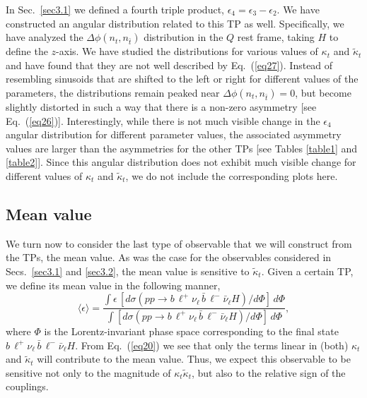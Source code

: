 \documentclass[aps,preprint,tightenlines,floatfix,superscriptaddress,nofootinbib,showpacs]{revtex4-1}
\def\beq{\begin{equation}}
\def\eeq{\end{equation}}
\def\tbar{\bar{t}}
\def\bbar{\bar{b}}
\def\kp{\kappa_t}
\def\kpt{\tilde{\kappa}_t}
\begin{document}
In Sec.~\ref{sec3.1} we defined a fourth triple product,
$\epsilon_4 = \epsilon_3-\epsilon_2$.  We have constructed
an angular distribution related to this TP as well.
Specifically, we have analyzed the
$\Delta\phi(n_t,n_{\tbar})$ distribution in the $Q$ rest frame,
taking
$H$ to define the $z$-axis.  We have studied the distributions
for various values of $\kp$ and $\kpt$ and have
found that they are not well described by Eq.~(\ref{eq27}).
Instead of resembling sinusoids that are shifted to the left or
right for different values of the parameters, the distributions
remain peaked near $\Delta\phi(n_t,n_{\tbar})=0$, but become
slightly distorted in such a way that there is a non-zero
asymmetry [see Eq.~(\ref{eq26})].  Interestingly, while there
is not much visible change in the $\epsilon_4$ angular distribution
for different
parameter values, the associated asymmetry values are
larger than the asymmetries for the other TPs [see
  Tables \ref{table1} and \ref{table2}].  Since this angular
distribution does not exhibit much visible change for
different values of $\kp$ and $\kpt$, we do not include the corresponding
plots here.

\subsection{Mean value}
\label{sec3.3}
We turn now to consider the last type of observable that we will
construct from the TPs, the mean value. As was the case for the
observables considered in Secs.~\ref{sec3.1} and \ref{sec3.2},
the mean value is sensitive to $\kpt$.  Given a certain
TP, we define its mean value in the following manner,
%
\beq
\label{eq28}
\langle \epsilon \rangle = \frac{\int\epsilon\, [d\sigma (pp\to b\,\ell^+\nu_{\ell}\,\bbar\,\ell^-\bar{\nu}_{\ell}H)/ d\Phi]\,d\Phi}{\int [d\sigma (pp\to b\,\ell^+\nu_{\ell}\,\bbar\,\ell^-\bar{\nu}_{\ell}H)/ d\Phi]\,d\Phi},
\eeq
%
where $\Phi$ is the Lorentz-invariant phase space corresponding to the
final state
$b\,\ell^+\nu_{\ell}\,\bbar\,\ell^-\bar{\nu}_{\ell}H$. From
Eq.~(\ref{eq20}) we see that only the terms linear in (both) $\kp$ and $\kpt$
will contribute to the mean value.  Thus, we expect this observable
to be sensitive not only to the magnitude of $\kp\kpt$,
but also to the relative sign of
the couplings.\par
\end{document}
